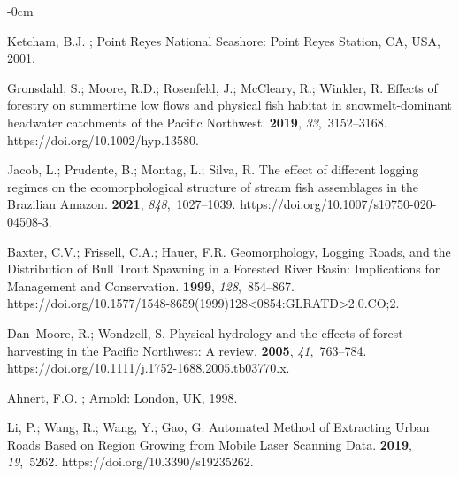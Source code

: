 \documentclass[remotesensing,article,accept,pdftex,moreauthors]{Definitions/mdpi}
\begin{document}
\begin{adjustwidth}{-\extralength}{0cm}
\begin{thebibliography}{999}
Ketcham, B.J.
; Point Reyes National Seashore: Point Reyes Station, CA, USA, 2001.

Gronsdahl, %
 S.; Moore, R.D.; Rosenfeld, J.; McCleary, R.; Winkler, R.
\newblock Effects of forestry on summertime low flows and physical fish habitat
  in snowmelt-dominant headwater catchments of the Pacific Northwest.
 {\bf 2019}, {\em 33},~3152--3168. https://doi.org/10.1002/hyp.13580.

Jacob, L.; Prudente, B.; Montag, L.; Silva, R.
\newblock The effect of different logging regimes on the ecomorphological
  structure of stream fish assemblages in the Brazilian Amazon.
 {\bf 2021}, {\em 848},~{1027--1039.}
\newblock https://doi.org/10.1007/s10750-020-04508-3.

Baxter, C.V.; Frissell, C.A.; Hauer, F.R.
\newblock Geomorphology, Logging Roads, and the Distribution of Bull Trout
  Spawning in a Forested River Basin: Implications for Management and
  Conservation.
 {\bf
  1999}, {\em 128},~854--867. https://doi.org/10.1577/1548-8659(1999)128<0854:GLRATD>2.0.CO;2.

Dan~Moore, %
 R.; Wondzell, S.
\newblock Physical hydrology and the effects of forest harvesting in the
  Pacific Northwest: A review.
 {\bf 2005},
  {\em 41},~763--784. https://doi.org/10.1111/j.1752-1688.2005.tb03770.x.

Ahnert, F.O.
; Arnold: London, UK, 1998.

Li, P.; Wang, R.; Wang, Y.; Gao, G.
\newblock Automated Method of Extracting Urban Roads Based on Region Growing
  from Mobile Laser Scanning Data.
 {\bf 2019}, {\em 19},~5262. https://doi.org/10.3390/s19235262.


\end{thebibliography}
\end{adjustwidth}
\end{document}
